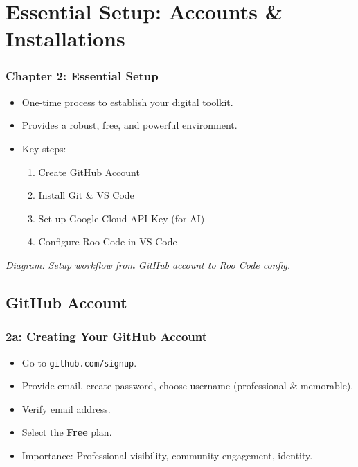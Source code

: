 \documentclass{beamer}
\begin{document}

\section{Essential Setup: Accounts & Installations}
\begin{frame}
  \frametitle{Chapter 2: Essential Setup}
  \begin{itemize}
    \item One-time process to establish your digital toolkit.
    \item Provides a robust, free, and powerful environment.
    \item Key steps:
    \begin{enumerate}
        \item Create GitHub Account
        \item Install Git \& VS Code
        \item Set up Google Cloud API Key (for AI)
        \item Configure Roo Code in VS Code
    \end{enumerate}
  \end{itemize}
  \vfill
  \textit{Diagram: Setup workflow from GitHub account to Roo Code config.}
\end{frame}

\subsection{GitHub Account}
\begin{frame}
  \frametitle{2a: Creating Your GitHub Account}
  \begin{itemize}
    \item Go to \texttt{github.com/signup}.
    \item Provide email, create password, choose username (professional \& memorable).
    \item Verify email address.
    \item Select the \textbf{Free} plan.
    \item Importance: Professional visibility, community engagement, identity.
  \end{itemize}
\end{frame}
\end{document}
